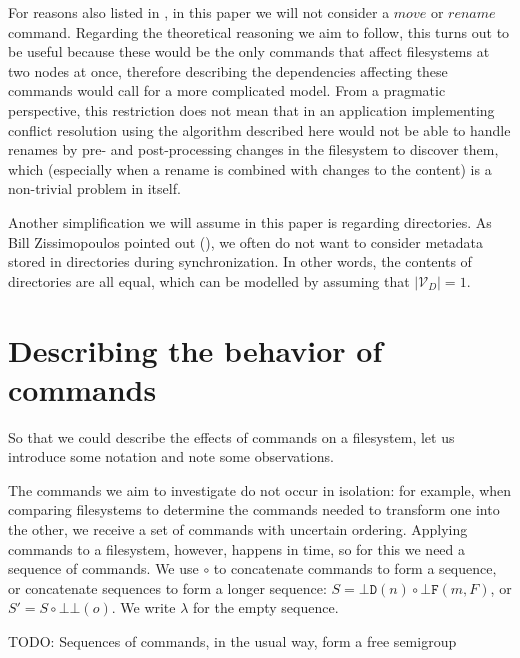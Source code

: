 \documentclass[12pt]{article}
\newcommand{\setvx}[1]{\mathcal{V}_{#1}}
\newcommand{\setd}{\setvx{D}} %
\newcommand{\empt}{\bot}
\newcommand{\fscommand}[2]{{#1#2}}
\newcommand{\fsregcommandchar}[1]{\mathtt{#1}}
\newcommand{\fsregcommand}[2]{\fscommand{\fsregcommandchar{#1}}{\fsregcommandchar{#2}}}
\newcommand{\cbb}{\fsregcommand{\empt}{\empt}}
\newcommand{\cbf}{\fsregcommand{\empt}{F}}
\newcommand{\cbd}{\fsregcommand{\empt}{D}}
\newcommand{\cc}{\circ} %
\newcommand{\emptyseq}{\lambda} %
\theoremstyle{definition}
\begin{document}

For reasons also listed in \cite{NREC:alg}, in this paper we will not consider
a $move$ or $rename$ command. Regarding the theoretical reasoning we aim to follow,
this turns out to be useful because these would be the only commands that affect
filesystems at two nodes at once, therefore describing 
the dependencies affecting these commands
would call for a more complicated model.
From a pragmatic perspective, this restriction does not mean that in an application
implementing conflict resolution using the algorithm described here would not be
able to handle renames by pre- and post-processing changes in the filesystem to
discover them, which (especially when a rename is combined with changes to the content)
is a non-trivial problem in itself.

Another simplification we will assume in this paper is regarding directories.
As Bill Zissimopoulos pointed out (\cite{BZ}), we often do not want to consider metadata stored in
directories during synchronization. In other words, the contents of directories are all equal,
which can be modelled by assuming that $|\setd|=1$.




\section{Describing the behavior of commands}


So that we could describe the effects of commands on a filesystem, let us introduce some notation
and note some observations.

The commands we aim to investigate do not occur in isolation:
for example, when comparing filesystems to determine the commands needed to transform one into the other,
we receive a set of commands with uncertain ordering.
Applying commands to a filesystem, however, happens in time,
so for this we need a sequence of commands.
We use $\cc$ to concatenate commands to form a sequence, or concatenate sequences to form a longer sequence:
$S=\cbd(n)\cc \cbf(m,F)$, or $S'=S\cc\cbb(o)$.
We write $\emptyseq$ for the empty sequence.

TODO: Sequences of commands, in the usual way,  form a free
semigroup
\end{document}
